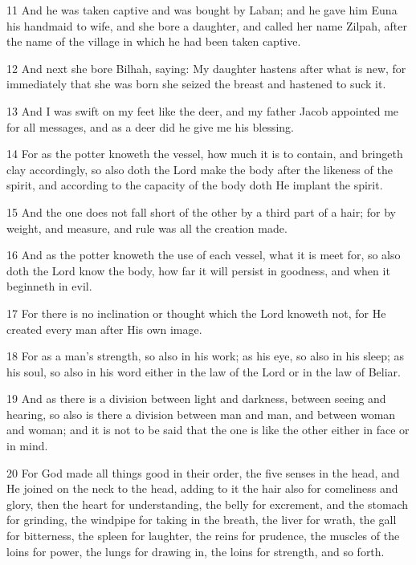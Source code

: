 \par 11 And he was taken captive and was bought by Laban; and he gave him Euna his handmaid to wife, and she bore a daughter, and called her name Zilpah, after the name of the village in which he had been taken captive.

\par 12 And next she bore Bilhah, saying: My daughter hastens after what is new, for immediately that she was born she seized the breast and hastened to suck it.

\par 13 And I was swift on my feet like the deer, and my father Jacob appointed me for all messages, and as a deer did he give me his blessing.

\par 14 For as the potter knoweth the vessel, how much it is to contain, and bringeth clay accordingly, so also doth the Lord make the body after the likeness of the spirit, and according to the capacity of the body doth He implant the spirit.

\par 15 And the one does not fall short of the other by a third part of a hair; for by weight, and measure, and rule was all the creation made.

\par 16 And as the potter knoweth the use of each vessel, what it is meet for, so also doth the Lord know the body, how far it will persist in goodness, and when it beginneth in evil.

\par 17 For there is no inclination or thought which the Lord knoweth not, for He created every man after His own image.

\par 18 For as a man's strength, so also in his work; as his eye, so also in his sleep; as his soul, so also in his word either in the law of the Lord or in the law of Beliar.

\par 19 And as there is a division between light and darkness, between seeing and hearing, so also is there a division between man and man, and between woman and woman; and it is not to be said that the one is like the other either in face or in mind.

\par 20 For God made all things good in their order, the five senses in the head, and He joined on the neck to the head, adding to it the hair also for comeliness and glory, then the heart for understanding, the belly for excrement, and the stomach for grinding, the windpipe for taking in the breath, the liver for wrath, the gall for bitterness, the spleen for laughter, the reins for prudence, the muscles of the loins for power, the lungs for drawing in, the loins for strength, and so forth.

